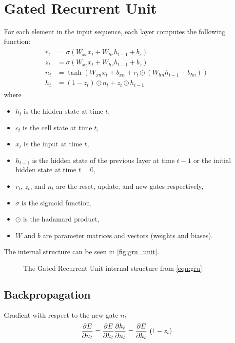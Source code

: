 \section{Gated Recurrent Unit}
For each element in the input sequence, each layer computes the following function:
\begin{align}
    \label{eqn:gru}
    \begin{split}
        r_t &= \sigma(W_{xr}x_t +  W_{hr}h_{t-1} + b_{r}) \\
        z_t &= \sigma(W_{xz}x_t + W_{hz}h_{t-1} + b_{z}) \\
        n_t &= \tanh(W_{xn}x_t + b_{xn} + r_t \odot (W_{hn}h_{t-1} + b_{hn})) \\
        h_t &= (1 - z_t) \odot n_t + z_t \odot h_{t-1}
    \end{split}
\end{align}
where
\begin{itemize}
    \item $h_t$ is the hidden state at time $t$,
    \item $c_t$ is the cell state at time $t$,
    \item $x_t$ is the input at time $t$,
    \item $h_{t-1}$ is the hidden state of the previous layer at time $t-1$ or the initial hidden state at time $t=0$,
    \item $r_t$, $z_t$, and $n_t$ are the reset, update, and new gates respectively,
    \item $\sigma$ is the sigmoid function,
    \item $\odot$ is the hadamard product,
    \item $W$ and $b$ are parameter matrices and vectors (weights and biases).
\end{itemize}
The  internal structure can be seen in \autoref{fig:gru_unit}.

\begin{figure}[htbp]
    \centering
    \caption{The Gated Recurrent Unit internal structure from \autoref{eqn:gru}}
    \label{fig:gru_unit}
\end{figure}

\subsection{Backpropagation}
Gradient with respect to the new gate $n_t$
\newcommand{\pdvEnt}{\pdv{E}{h_t}~(1-z_t)}
\begin{equation}
    \pdv{E}{n_t} = \pdv{E}{h_t} \pdv{h_t}{n_t} = \pdvEnt
\end{equation}

